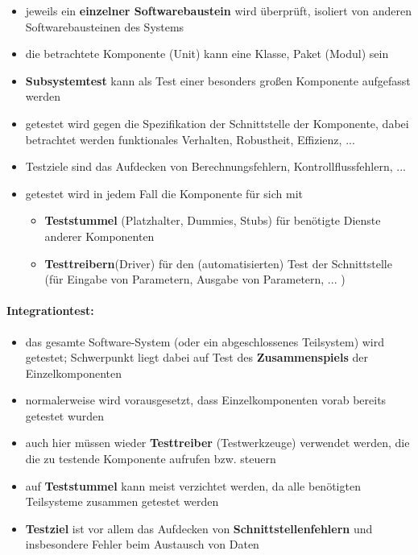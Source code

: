 \begin{itemize}
	\item jeweils ein \textbf{einzelner Softwarebaustein} wird überprüft, isoliert von anderen Softwarebausteinen des Systems
	\item die betrachtete Komponente (Unit) kann eine Klasse, Paket (Modul) sein
	\item \textbf{Subsystemtest} kann als Test einer besonders großen Komponente aufgefasst werden
	\item getestet wird gegen die Spezifikation der Schnittstelle der Komponente, dabei betrachtet werden funktionales Verhalten, Robustheit, Effizienz, ...
	\item Testziele sind das Aufdecken von Berechnungsfehlern, Kontrollflussfehlern, ...
	\item getestet wird in jedem Fall die Komponente für sich mit
	\begin{itemize}
		\item \textbf{Teststummel} (Platzhalter, Dummies, Stubs) für benötigte Dienste anderer Komponenten
		\item \textbf{Testtreibern}(Driver) für den (automatisierten) Test der Schnittstelle (für Eingabe von Parametern, Ausgabe von Parametern, ... )
	\end{itemize}
\end{itemize}

\paragraph{Integrationtest:}

\begin{itemize}
	\item das gesamte Software-System (oder ein abgeschlossenes Teilsystem) wird getestet; Schwerpunkt liegt dabei auf Test des \textbf{Zusammenspiels} der Einzelkomponenten
	\item normalerweise wird vorausgesetzt, dass Einzelkomponenten vorab bereits getestet wurden
	\item auch hier müssen wieder \textbf{Testtreiber} (Testwerkzeuge) verwendet werden, die die zu testende Komponente aufrufen bzw. steuern
	\item auf \textbf{Teststummel} kann meist verzichtet werden, da alle benötigten Teilsysteme zusammen getestet werden
	\item \textbf{Testziel} ist vor allem das Aufdecken von \textbf{Schnittstellenfehlern} und insbesondere Fehler beim Austausch von Daten
\end{itemize}

